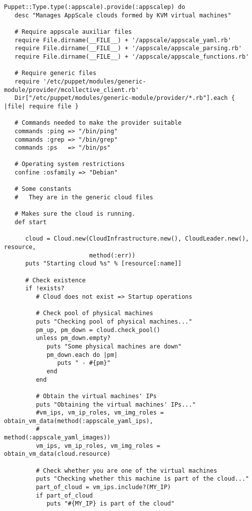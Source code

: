 \begin{lstlisting}
Puppet::Type.type(:appscale).provide(:appscalep) do
   desc "Manages AppScale clouds formed by KVM virtual machines"

   # Require appscale auxiliar files
   require File.dirname(__FILE__) + '/appscale/appscale_yaml.rb'
   require File.dirname(__FILE__) + '/appscale/appscale_parsing.rb'
   require File.dirname(__FILE__) + '/appscale/appscale_functions.rb'
   
   # Require generic files
   require '/etc/puppet/modules/generic-module/provider/mcollective_client.rb'
   Dir["/etc/puppet/modules/generic-module/provider/*.rb"].each { |file| require file }
   
   # Commands needed to make the provider suitable
   commands :ping => "/bin/ping"
   commands :grep => "/bin/grep"
   commands :ps   => "/bin/ps"
   
   # Operating system restrictions
   confine :osfamily => "Debian"

   # Some constants
   #   They are in the generic cloud files

   # Makes sure the cloud is running.
   def start

      cloud = Cloud.new(CloudInfrastructure.new(), CloudLeader.new(), resource,
                        method(:err))
      puts "Starting cloud %s" % [resource[:name]]
      
      # Check existence
      if !exists?
         # Cloud does not exist => Startup operations
         
         # Check pool of physical machines
         puts "Checking pool of physical machines..."
         pm_up, pm_down = cloud.check_pool()
         unless pm_down.empty?
            puts "Some physical machines are down"
            pm_down.each do |pm|
               puts " - #{pm}"
            end
         end
         
         # Obtain the virtual machines' IPs
         puts "Obtaining the virtual machines' IPs..."
         #vm_ips, vm_ip_roles, vm_img_roles = obtain_vm_data(method(:appscale_yaml_ips),
         #                                                   method(:appscale_yaml_images))
         vm_ips, vm_ip_roles, vm_img_roles = obtain_vm_data(cloud.resource)
         
         # Check whether you are one of the virtual machines
         puts "Checking whether this machine is part of the cloud..."
         part_of_cloud = vm_ips.include?(MY_IP)
         if part_of_cloud
            puts "#{MY_IP} is part of the cloud"
            

\end{lstlisting}
